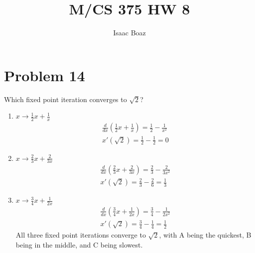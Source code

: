 \documentclass{article}
\title{\vspace{-5ex}M/CS 375 HW 8}
\author{Isaac Boaz}
\begin{document}
\maketitle

\section*{Problem 14}
Which fixed point iteration converges to \(\sqrt{2}\)?
\begin{enumerate}[label=(\Alph*)]
    \item \(x \rightarrow \frac{1}{2}x + \frac{1}{x}\)
    \begin{align*}
        \frac{d}{dx} \left( \frac{1}{2}x + \frac{1}{x} \right) = \frac{1}{2} - \frac{1}{x^2} \\
        x'(\sqrt{2}) = \frac{1}{2} - \frac{1}{2} = 0
    \end{align*}
    \item \(x \rightarrow \frac{2}{3}x + \frac{2}{3x}\)
    \begin{align*}
        \frac{d}{dx} \left( \frac{2}{3}x + \frac{2}{3x} \right) = \frac{2}{3} - \frac{2}{3x^2} \\
        x'(\sqrt{2}) = \frac{2}{3} - \frac{2}{6} = \frac{1}{3}
    \end{align*}
    \item \(x \rightarrow \frac{3}{4}x + \frac{1}{2x}\)
    \begin{align*}
        \frac{d}{dx} \left( \frac{3}{4}x + \frac{1}{2x} \right) = \frac{3}{4} - \frac{1}{2x^2} \\
        x'(\sqrt{2}) = \frac{3}{4} - \frac{1}{4} = \frac{1}{2}
    \end{align*}
    All three fixed point iterations converge to \(\sqrt{2}\), with A being the quickest, B being in the middle, and C being slowest.
\end{enumerate}
\end{document}
